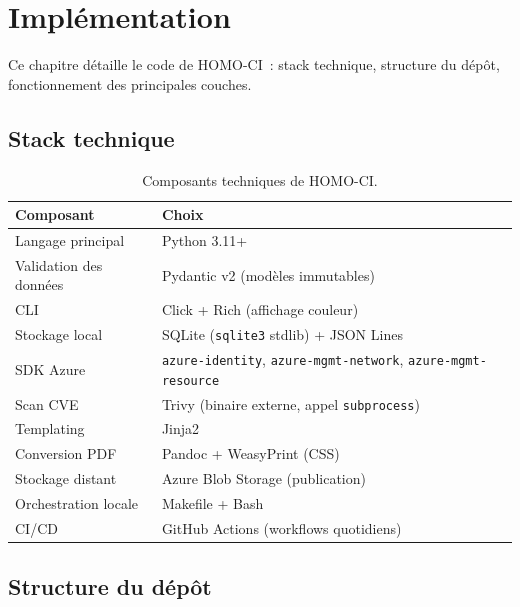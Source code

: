 \chapter{Implémentation}
\label{ch:implementation}

Ce chapitre détaille le code de HOMO-CI~: stack technique, structure
du dépôt, fonctionnement des principales couches.

\section{Stack technique}

\begin{table}[h]
\centering
\caption{Composants techniques de HOMO-CI.}
\label{tab:stack}
\small
\begin{tabularx}{\textwidth}{lX}
\toprule
\textbf{Composant} & \textbf{Choix} \\
\midrule
Langage principal & Python 3.11+ \\
Validation des données & Pydantic v2 (modèles immutables) \\
CLI & Click + Rich (affichage couleur) \\
Stockage local & SQLite (\texttt{sqlite3} stdlib) + JSON Lines \\
SDK Azure & \texttt{azure-identity}, \texttt{azure-mgmt-network}, \texttt{azure-mgmt-resource} \\
Scan CVE & Trivy (binaire externe, appel \texttt{subprocess}) \\
Templating & Jinja2 \\
Conversion PDF & Pandoc + WeasyPrint (CSS) \\
Stockage distant & Azure Blob Storage (publication) \\
Orchestration locale & Makefile + Bash \\
CI/CD & GitHub Actions (workflows quotidiens) \\
\bottomrule
\end{tabularx}
\end{table}

\section{Structure du dépôt}

